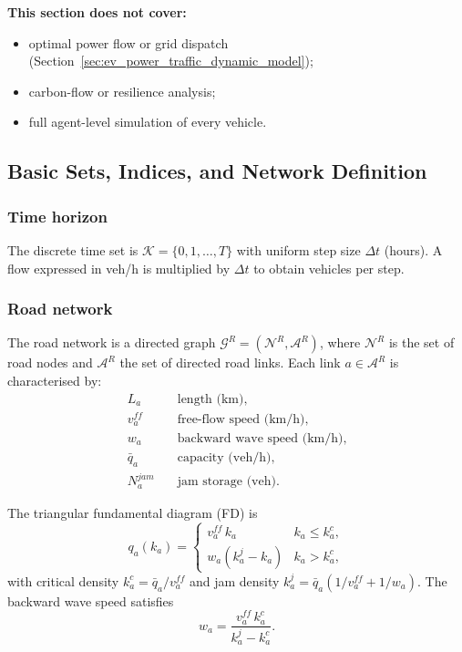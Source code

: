 \noindent\textbf{This section does not cover:}
\begin{itemize}
  \item optimal power flow or grid dispatch (Section~\ref{sec:ev_power_traffic_dynamic_model});
  \item carbon-flow or resilience analysis;
  \item full agent-level simulation of every vehicle.
\end{itemize}

\subsection{Basic Sets, Indices, and Network Definition}
\label{sec:traffic-network}

\subsubsection{Time horizon}

The discrete time set is $\mathcal{K} = \{0, 1, \ldots, T\}$ with
uniform step size $\Delta t$ (hours).  A flow expressed in veh/h is
multiplied by $\Delta t$ to obtain vehicles per step.

\subsubsection{Road network}

The road network is a directed graph
$\mathcal{G}^{R} = (\mathcal{N}^{R}, \mathcal{A}^{R})$,
where $\mathcal{N}^{R}$ is the set of road nodes and
$\mathcal{A}^{R}$ the set of directed road links.
Each link $a \in \mathcal{A}^{R}$ is characterised by:
\begin{align*}
  L_a         &\quad \text{length (km)}, \\
  v^{ff}_a    &\quad \text{free-flow speed (km/h)}, \\
  w_a         &\quad \text{backward wave speed (km/h)}, \\
  \bar{q}_a   &\quad \text{capacity (veh/h)}, \\
  N^{jam}_a   &\quad \text{jam storage (veh)}.
\end{align*}

The triangular fundamental diagram (FD) is
\begin{equation}
  q_a(k_a) =
  \begin{cases}
    v^{ff}_a \, k_a           & k_a \le k^c_a, \\
    w_a(k^j_a - k_a)          & k_a > k^c_a,
  \end{cases}
  \label{eq:triangular-fd}
\end{equation}
with critical density $k^c_a = \bar{q}_a / v^{ff}_a$ and jam density
$k^j_a = \bar{q}_a (1/v^{ff}_a + 1/w_a)$.
The backward wave speed satisfies
\begin{equation}
  w_a = \frac{v^{ff}_a \, k^c_a}{k^j_a - k^c_a}.
  \label{eq:wave-speed}
\end{equation}


